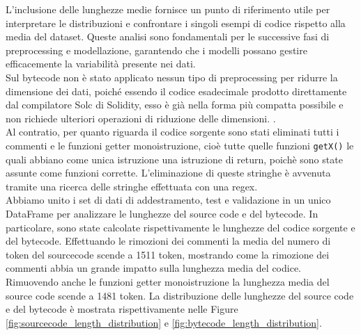 \documentclass[../../Thesis.tex]{subfiles}
\begin{document}
L'inclusione delle lunghezze medie fornisce un punto di riferimento utile per interpretare le distribuzioni e confrontare i singoli esempi di codice rispetto alla media del dataset. Queste analisi sono fondamentali per le successive fasi di preprocessing e modellazione, garantendo che i modelli possano gestire efficacemente la variabilità presente nei dati.\\
Sul bytecode non è stato applicato nessun tipo di preprocessing per ridurre la dimensione dei dati, poiché essendo il codice esadecimale prodotto direttamente dal compilatore Solc di Solidity, esso è già nella forma più compatta possibile e non richiede ulteriori operazioni di riduzione delle dimensioni. .\\
Al contratio, per quanto riguarda il codice sorgente sono stati eliminati tutti i commenti e le funzioni getter monoistruzione, cioè tutte quelle funzioni \texttt{getX()} le quali abbiano come unica istruzione una istruzione di return, poichè sono state assunte come funzioni corrette. L'eliminazione di queste stringhe è avvenuta tramite una ricerca delle stringhe effettuata con una regex.\\
Abbiamo unito i set di dati di addestramento, test e validazione in un unico DataFrame per analizzare le lunghezze del source code e del bytecode. In particolare, sono state calcolate rispettivamente le lunghezze del codice sorgente e del bytecode. Effettuando le rimozioni dei commenti la media del numero di token del sourcecode scende a 1511 token, mostrando come la rimozione dei commenti abbia un grande impatto sulla lunghezza media del codice. Rimuovendo anche le funzioni getter monoistruzione la lunghezza media del source code scende a 1481 token. La distribuzione delle lunghezze del source code e del bytecode è mostrata rispettivamente nelle Figure \ref{fig:sourcecode_length_distribution} e \ref{fig:bytecode_length_distribution}.\\
\end{document}

